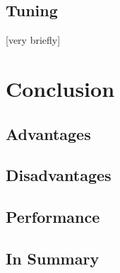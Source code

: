 \documentclass[titlepage, a4paper, 11pt]{scrartcl}
\begin{document}
        


        \subsection{Tuning}\label{analysis:tuning}

        [very briefly]


    \section{Conclusion}

        \subsection{Advantages}


        \subsection{Disadvantages}


        \subsection{Performance}
    


        \subsection{In Summary}

      

            
    
\end{document}
